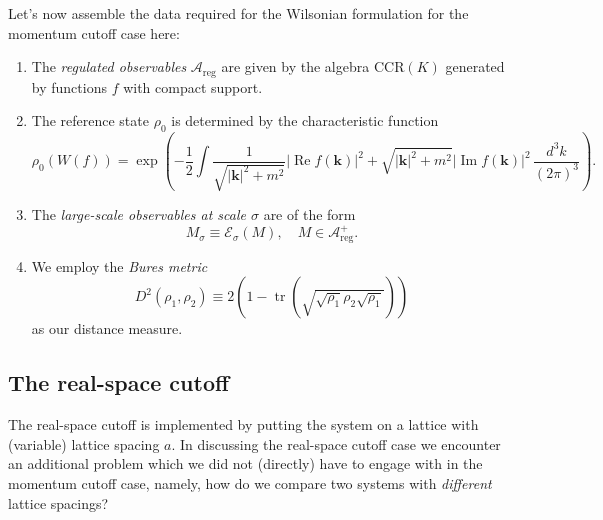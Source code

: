 \documentclass[11pt]{amsart}
\DeclareMathOperator{\tr}{tr}
\DeclareMathOperator{\im}{Im}
\DeclareMathOperator{\re}{Re}
\theoremstyle{plain}%
\theoremstyle{definition}
\theoremstyle{remark}
\begin{document}
Let's now assemble the data required for the Wilsonian formulation for the momentum cutoff case here:
\begin{enumerate}
	\item The \emph{regulated observables} $\mathcal{A}_{\text{reg}}$ are given by the algebra $\text{CCR}(K)$ generated by functions $f$ with compact support.
	\item The reference state $\rho_0$ is determined by the characteristic function
	\begin{equation*}
		\rho_0(W(f)) = \exp\left(-\frac{1}{2}\int \frac{1}{\sqrt{|\mathbf{k}|^2 + m^2}}|\re{f}(\mathbf{k})|^2 + \sqrt{|\mathbf{k}|^2 + m^2}|\im{f}(\mathbf{k})|^2 \,\frac{d^3k}{(2\pi)^3} \right).
	\end{equation*}
	\item The \emph{large-scale observables at scale $\sigma$} are of the form
	\begin{equation*}
		M_\sigma \equiv \mathcal{E}_\sigma(M), \quad M\in \mathcal{A}_{\text{reg}}^+.	
	\end{equation*}
	\item We employ the \emph{Bures metric} 
	\begin{equation*}
		D^2(\rho_1,\rho_2) \equiv 2\left(1-\tr\left(\sqrt{\sqrt{\rho_1}\rho_2\sqrt{\rho_1}}\right)\right)
	\end{equation*}
	as our distance measure.
\end{enumerate}


\subsection{The real-space cutoff}
The real-space cutoff is implemented by putting the system on a lattice with (variable) lattice spacing $a$. In discussing the real-space cutoff case we encounter an additional problem which we did not (directly) have to engage with in the momentum cutoff case, namely, how do we compare two systems with \emph{different} lattice spacings? 
\end{document}
